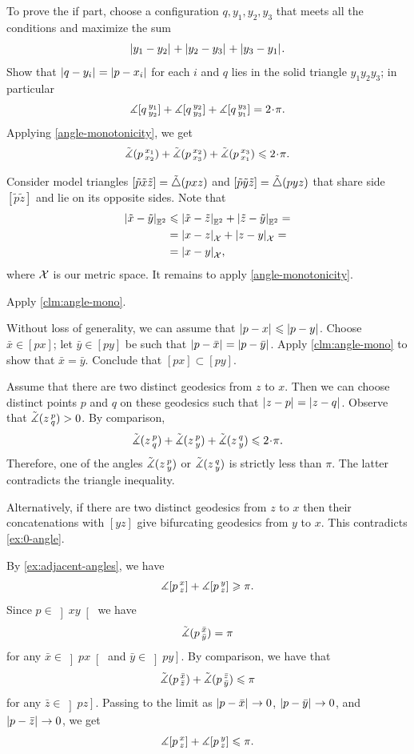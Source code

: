 To prove the if part, choose a configuration $q,y_1,y_2,y_3$ that meets all the conditions and maximize the sum
\[\dist{y_1}{y_2}{}+\dist{y_2}{y_3}{}+\dist{y_3}{y_1}{}.\]
Show that $\dist{q}{y_i}{}=\dist{p}{x_i}{}$ for each $i$ and $q$ lies in the solid triangle $y_1y_2y_3$;
in particular 
\[\mangle \hinge q{y_1}{y_2}+\mangle \hinge q{y_2}{y_3}+ \mangle \hinge q{y_3}{y_1}=2\cdot\pi.\]
Applying \ref{angle-monotonicity}, we get
\[\angk p{x_1}{x_2}+\angk p{x_2}{x_3}+\angk p{x_3}{x_1}
\le 
2\cdot\pi.
\]

Consider model triangles $[\tilde p\tilde x\tilde z]=\tilde\triangle(pxz)$ and $[\tilde p\tilde y\tilde z]=\tilde\triangle(pyz)$
that share side $[\tilde p\tilde z]$ and lie on its opposite sides.
Note that 
\begin{align*}
\dist{\tilde x}{\tilde y}{\EE^2}
&\le \dist{\tilde x}{\tilde z}{\EE^2}+\dist{\tilde z}{\tilde y}{\EE^2}=
\\
&=\dist{x}{z}{\spc{X}}+\dist{z}{y}{\spc{X}}=
\\
&=\dist{x}{y}{\spc{X}},
\end{align*}
where $\mathcal{X}$ is our metric space.
It remains to apply \ref{angle-monotonicity}.


Apply \ref{clm:angle-mono}.

Without loss of generality, we can assume that $\dist{p}{x}{}\le \dist{p}{y}{}$.
Choose $\bar x\in [px]$;
let $\bar y\in [py]$ be such that $\dist{p}{\bar x}{}=\dist{p}{\bar y}{}$.
Apply \ref{clm:angle-mono} to show that $\bar x=\bar y$.
Conclude that $[px]\subset [py]$.

Assume that there are two distinct geodesics from $z$ to $x$.
Then we can choose distinct points $p$ and $q$ on these geodesics such that $\dist{z}{p}{}=\dist{z}{q}{}$.
Observe that $\tilde\measuredangle(z\,{}^{p}_{q})>0$.
By comparison,
\[\angk zpq+\angk zpy+\angk zqy\le 2\cdot\pi.\]
Therefore, one of the angles $\tilde\measuredangle(z\,{}^{p}_{y})$ or $\tilde\measuredangle(z\,{}^{q}_{y})$ is strictly less than $\pi$.
The latter contradicts the triangle inequality.

Alternatively, if there are two distinct geodesics from $z$ to $x$ then their concatenations with $[yz]$ give bifurcating geodesics from $y$ to $x$. This contradicts \ref{ex:0-angle}.

By \ref{ex:adjacent-angles}, we have
\[\measuredangle[p\,{}^{x}_{z}]+\measuredangle[p\,{}^{y}_{z}]\geqslant \pi.\]
Since $p\in \left]xy\right[$ we have
\[\tilde\measuredangle(p\,{}^{\bar x}_{\bar y})=\pi\]
for any $\bar x\in \left]px\right[$ and $\bar y\in \left]py\right]$.
By comparison, we have that 
\[\tilde\measuredangle(p\,{}^{\bar x}_{\bar z})+\tilde\measuredangle(p\,{}^{\bar z}_{\bar y})\leqslant\pi\]
for any $\bar z\in \left]pz\right]$.
Passing to the limit as
$\dist{p}{\bar x}{}\to 0$,
$\dist{p}{\bar y}{}\to 0$, and
$\dist{p}{\bar z}{}\to 0$,
we get \[\measuredangle[p\,{}^{x}_{z}]+\measuredangle[p\,{}^{y}_{z}]\leqslant \pi.\]

